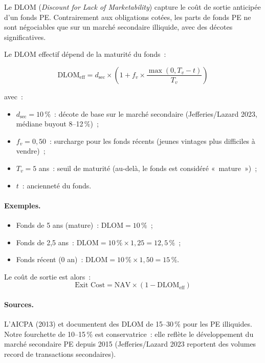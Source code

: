 \documentclass[12pt, a4paper, twoside, openright]{report}
\theoremstyle{definition}
\begin{document}
Le DLOM (\emph{Discount for Lack of Marketability}) capture le coût de sortie anticipée d'un fonds PE. Contrairement aux obligations cotées, les parts de fonds PE ne sont négociables que sur un marché secondaire illiquide, avec des décotes significatives.

Le DLOM effectif dépend de la maturité du fonds~:

\begin{equation}
\text{DLOM}_{\text{eff}} = d_{\text{sec}} \times \left(1 + f_v \times \frac{\max(0, T_v - t)}{T_v}\right)
\label{eq:dlom}
\end{equation}

\noindent avec~:
\begin{itemize}[nosep]
  \item $d_{\text{sec}} = 10\,\%$~: décote de base sur le marché secondaire (Jefferies/Lazard 2023, médiane buyout 8--12\,\%)~;
  \item $f_v = 0{,}50$~: surcharge pour les fonds récents (jeunes vintages plus difficiles à vendre)~;
  \item $T_v = 5$ ans~: seuil de maturité (au-delà, le fonds est considéré «~mature~»)~;
  \item $t$~: ancienneté du fonds.
\end{itemize}

\paragraph{Exemples.}
\begin{itemize}[nosep]
  \item Fonds de 5 ans (mature)~: $\text{DLOM} = 10\,\%$~;
  \item Fonds de 2{,}5 ans~: $\text{DLOM} = 10\,\% \times 1{,}25 = 12{,}5\,\%$~;
  \item Fonds récent (0 an)~: $\text{DLOM} = 10\,\% \times 1{,}50 = 15\,\%$.
\end{itemize}

Le coût de sortie est alors~:
$$\text{Exit Cost} = \text{NAV} \times (1 - \text{DLOM}_{\text{eff}})$$

\paragraph{Sources.} L'AICPA (2013) et \citet{pratt_grabowski2014} documentent des DLOM de 15--30\,\% pour les PE illiquides. Notre fourchette de 10--15\,\% est conservatrice~: elle reflète le développement du marché secondaire PE depuis 2015 (Jefferies/Lazard 2023 reportent des volumes record de transactions secondaires).
\end{document}
